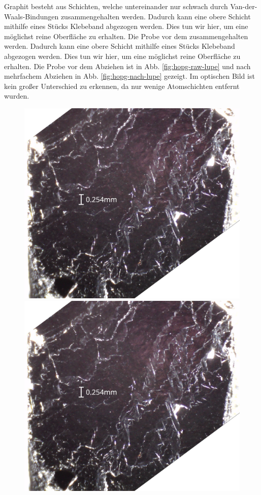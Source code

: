 \documentclass{article}
\begin{document}
Graphit besteht aus Schichten, welche untereinander nur schwach durch Van-der-Waals-Bindungen
zusammengehalten werden. Dadurch kann eine obere Schicht mithilfe eines Stücks Klebeband abgezogen werden.
Dies tun wir hier, um eine möglichst reine Oberfläche zu erhalten. Die Probe vor dem
zusammengehalten werden. Dadurch kann eine obere Schicht mithilfe eines Stücks Klebeband abgezogen werden.
Dies tun wir hier, um eine möglichst reine Oberfläche zu erhalten. Die Probe vor dem
Abziehen ist in Abb. \ref{fig:hopg-raw-lupe} und nach mehrfachem Abziehen in Abb. \ref{fig:hopg-nach-lupe}
gezeigt. Im optischen Bild ist kein großer Unterschied zu erkennen, da nur wenige Atomschichten entfernt wurden.

\begin{figure}[h]
    \centering
    \begin{minipage}{0.52\textwidth}
        \centering
        \includegraphics[width=\textwidth]{HOPG_roh}
        \includegraphics[width=\textwidth]{HOPG_roh}

\end{minipage}
\end{figure}
\end{document}

